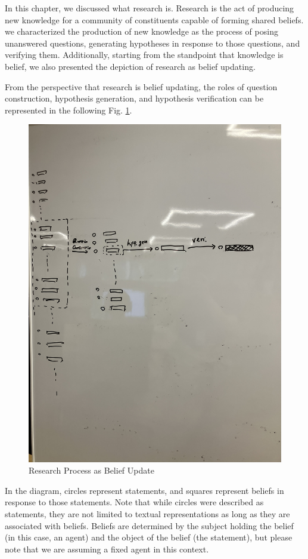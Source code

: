 \documentclass{book}
\begin{document}
In this chapter, we discussed what research is. Research is the act of producing new knowledge for a community of constituents capable of forming shared beliefs. we characterized the production of new knowledge as the process of posing unanswered questions, generating hypotheses in response to those questions, and verifying them. Additionally, starting from the standpoint that knowledge is belief, we also presented the depiction of research as belief updating.

From the perspective that research is belief updating, the roles of question construction, hypothesis generation, and hypothesis verification can be represented in the following Fig. \ref{fig:beliefupdate}. 
\begin{figure}[htb]
    \centering
    \includegraphics[width=\textwidth]{figs/beliefupdate.jpg}
    \caption{Research Process as Belief Update}
    \label{fig:beliefupdate}
\end{figure}
In the diagram, circles represent statements, and squares represent beliefs in response to those statements. Note that while circles were described as statements, they are not limited to textual representations as long as they are associated with beliefs. Beliefs are determined by the subject holding the belief (in this case, an agent) and the object of the belief (the statement), but please note that we are assuming a fixed agent in this context.
\end{document}

